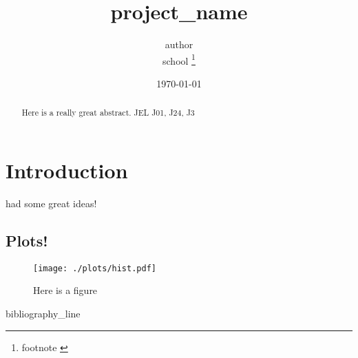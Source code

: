 \documentclass[11pt]{article}
\begin{document}
 

\title{ {{project_name}} }

\date{\today}

\author{ {{ author }} \\ {{ school }} \footnote{ {{ footnote }} } }
\maketitle

\begin{abstract}
\noindent  Here is a really great abstract.  \newline
\noindent JEL J01, J24, J3
\end{abstract} 

\section{Introduction}
\cite{smith1999wealth} had some great ideas! 

\subsection{Plots!}

\begin{figure}[h]
  \begin{center}
  \caption{Here is a figure} \label{fig:hist}
  \texttt{[image: ./plots/hist.pdf]}
  \end{center} 
\end{figure}


{{ bibliography_line }}
\end{document}

